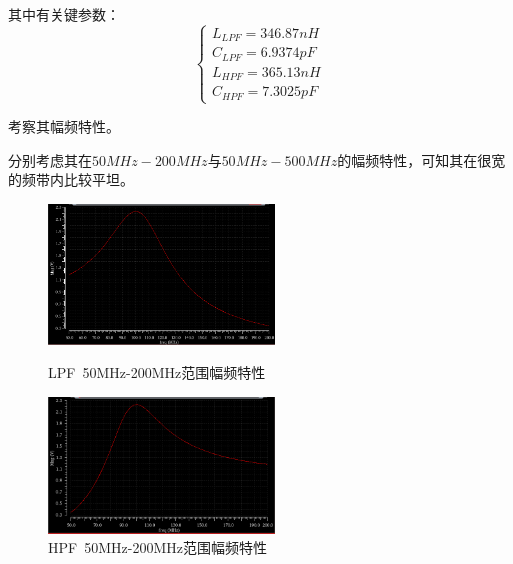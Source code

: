 \documentclass[12pt, a4paper]{article}
\begin{document}
    其中有关键参数：
    $$
    \begin{cases}
    	L_{LPF} = 346.87nH \\
    	C_{LPF} = 6.9374pF \\
    	L_{HPF} = 365.13nH\\
    	C_{HPF} = 7.3025pF 
    \end{cases}
    $$\par
    考察其幅频特性。\par
    分别考虑其在$50MHz-200MHz$与$50MHz-500MHz$的幅频特性，可知其在很宽的频带内比较平坦。
     \begin{figure}[htbp]
    	\centering
    	\begin{minipage}[t]{0.48\textwidth}
    		\centering
    		\includegraphics[width=6cm]{L-LP-STD-plot-50-200}
    		\caption{LPF\ 50MHz-200MHz范围幅频特性}
    	\end{minipage}
    	\begin{minipage}[t]{0.48\textwidth}
    		\centering
    		\includegraphics[width=6cm]{L-HP-STD-plot-50-200}
    		\caption{HPF\ 50MHz-200MHz范围幅频特性}
    	\end{minipage}
    \end{figure}\par
\end{document}

